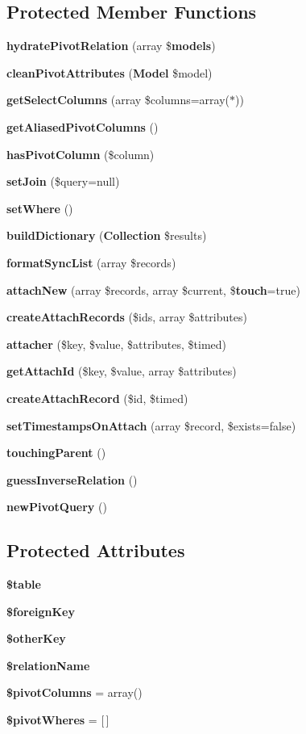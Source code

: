 \subsection*{Protected Member Functions}
\begin{DoxyCompactItemize}
\item 
{\bf hydrate\+Pivot\+Relation} (array \${\bf models})
\item 
{\bf clean\+Pivot\+Attributes} ({\bf Model} \$model)
\item 
{\bf get\+Select\+Columns} (array \$columns=array(\textquotesingle{}$\ast$\textquotesingle{}))
\item 
{\bf get\+Aliased\+Pivot\+Columns} ()
\item 
{\bf has\+Pivot\+Column} (\$column)
\item 
{\bf set\+Join} (\$query=null)
\item 
{\bf set\+Where} ()
\item 
{\bf build\+Dictionary} ({\bf Collection} \$results)
\item 
{\bf format\+Sync\+List} (array \$records)
\item 
{\bf attach\+New} (array \$records, array \$current, \${\bf touch}=true)
\item 
{\bf create\+Attach\+Records} (\$ids, array \$attributes)
\item 
{\bf attacher} (\$key, \$value, \$attributes, \$timed)
\item 
{\bf get\+Attach\+Id} (\$key, \$value, array \$attributes)
\item 
{\bf create\+Attach\+Record} (\$id, \$timed)
\item 
{\bf set\+Timestamps\+On\+Attach} (array \$record, \$exists=false)
\item 
{\bf touching\+Parent} ()
\item 
{\bf guess\+Inverse\+Relation} ()
\item 
{\bf new\+Pivot\+Query} ()
\end{DoxyCompactItemize}
\subsection*{Protected Attributes}
\begin{DoxyCompactItemize}
\item 
{\bf \$table}
\item 
{\bf \$foreign\+Key}
\item 
{\bf \$other\+Key}
\item 
{\bf \$relation\+Name}
\item 
{\bf \$pivot\+Columns} = array()
\item 
{\bf \$pivot\+Wheres} = [$\,$]
\end{DoxyCompactItemize}
